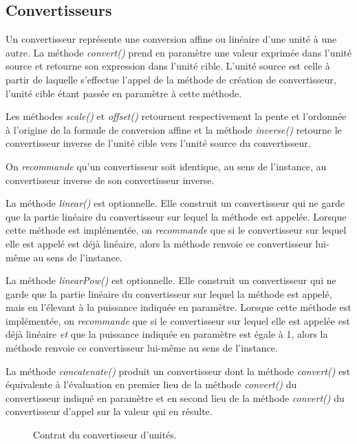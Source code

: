 \documentclass[a4paper,twoside,10pt]{article}
\begin{document}
\subsection{Convertisseurs}

Un convertisseur représente une conversion affine ou linéaire d'une unité à une autre. La méthode \emph{convert()} prend
en paramètre une valeur exprimée dans l'unité source et retourne son expression dans l'unité cible. L'unité source est
celle à partir de laquelle s'effectue l'appel de la méthode de création de convertisseur, l'unité cible étant passée en
paramètre à cette méthode.

Les méthodes \emph{scale()} et \emph{offset()} retournent respectivement la pente et l'ordonnée à l'origine de la
formule de conversion affine et la méthode \emph{inverse()} retourne le convertisseur inverse de l'unité
cible vers l'unité source du convertisseur.

On \emph{recommande} qu'un convertisseur soit identique, au sens de l'instance, au convertisseur inverse de son
convertisseur inverse.

La méthode \emph{linear()} est optionnelle. Elle construit un convertisseur qui ne garde que la partie linéaire du
convertisseur sur lequel la méthode est appelée. Lorsque cette méthode est implémentée, on \emph{recommande} que si le
convertisseur sur lequel elle est appelé est déjà linéaire, alors la méthode renvoie ce convertisseur lui-même au sens
de l'instance.

La méthode \emph{linearPow()} est optionnelle. Elle construit un convertisseur qui ne garde que la partie linéaire du
convertisseur sur lequel la méthode est appelé, mais en l'élevant à la puissance indiquée en paramètre. Lorsque cette
méthode est implémentée, on \emph{recommande} que si le convertisseur sur lequel elle est appelée est déjà linéaire
\emph{et} que la puissance indiquée en paramètre est égale à 1, alors la méthode renvoie ce convertisseur lui-même au
sens de l'instance.

La méthode \emph{concatenate()} produit un convertisseur dont la méthode \emph{convert()} est équivalente à l'évaluation
en premier lieu de la méthode \emph{convert()} du convertisseur indiqué en paramètre et en second lieu de la méthode
\emph{convert()} du convertisseur d'appel sur la valeur qui en résulte.

\begin{figure}[!h]
\caption{Contrat du convertisseur d'unités.}
\end{figure}
\end{document}
